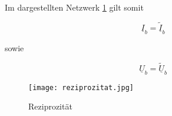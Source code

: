 Im dargestellten Netzwerk \ref{fig:beweis} gilt somit

\begin{equation}\label{equ:verticImpedance}
    \underline{I}_b =  \underline{\tilde{I}}_b
  \end{equation}
  
sowie 		
  
\begin{equation}\label{equ:verticImpedance}
    \underline{U}_b =  \underline{\widetilde{U}}_b
  \end{equation}
  
  
  
\begin{figure}[H]
\centering
\texttt{[image: reziprozitat.jpg]}
	\caption{Reziprozität \cite{p._niklaus_2-tore_2019}}
		\label{fig:beweis}
\end{figure}


\newpage


